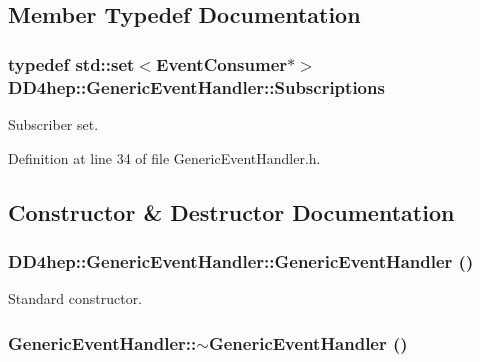 \subsection{Member Typedef Documentation}
\hypertarget{class_d_d4hep_1_1_generic_event_handler_a4b7fd1ba9fc0adab2fa1885162e69076}{
\subsubsection[{Subscriptions}]{\setlength{\rightskip}{0pt plus 5cm}typedef std::set$<${\bf EventConsumer}$\ast$$>$ {\bf DD4hep::GenericEventHandler::Subscriptions}}}
\label{class_d_d4hep_1_1_generic_event_handler_a4b7fd1ba9fc0adab2fa1885162e69076}


Subscriber set. 

Definition at line 34 of file GenericEventHandler.h.

\subsection{Constructor \& Destructor Documentation}
\hypertarget{class_d_d4hep_1_1_generic_event_handler_aef493617474019a953be658fdec60edc}{
\subsubsection[{GenericEventHandler}]{\setlength{\rightskip}{0pt plus 5cm}DD4hep::GenericEventHandler::GenericEventHandler ()}}
\label{class_d_d4hep_1_1_generic_event_handler_aef493617474019a953be658fdec60edc}


Standard constructor. \hypertarget{class_d_d4hep_1_1_generic_event_handler_a2e5420d14f01ae34c9a0a670a374cf71}{
\subsubsection[{$\sim$GenericEventHandler}]{\setlength{\rightskip}{0pt plus 5cm}GenericEventHandler::$\sim$GenericEventHandler ()}}
\label{class_d_d4hep_1_1_generic_event_handler_a2e5420d14f01ae34c9a0a670a374cf71}


